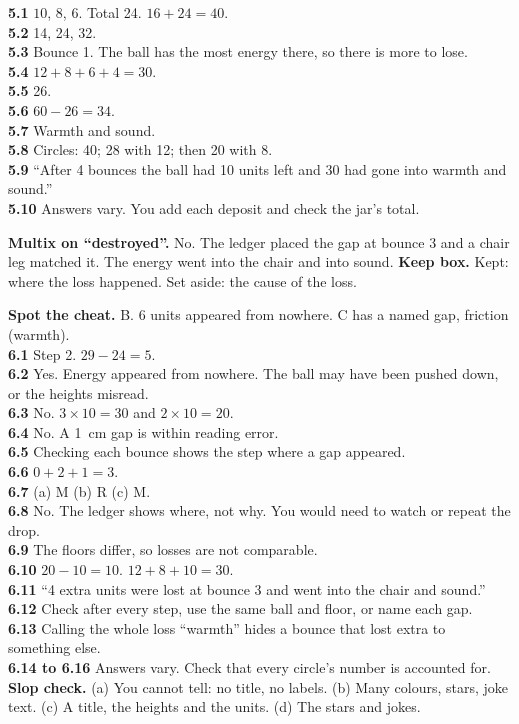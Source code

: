 \textbf{5.1} $10$, $8$, $6$. Total 24. $16+24=40$.\\
\textbf{5.2} 14, 24, 32.\\
\textbf{5.3} Bounce 1. The ball has the most energy there, so there is more to lose.\\
\textbf{5.4} $12+8+6+4=30$.\\
\textbf{5.5} 26.\\
\textbf{5.6} $60-26=34$.\\
\textbf{5.7} Warmth and sound.\\
\textbf{5.8} Circles: 40; 28 with 12; then 20 with 8.\\
\textbf{5.9} ``After 4 bounces the ball had 10 units left and 30 had gone into warmth and sound.''\\
\textbf{5.10} Answers vary. You add each deposit and check the jar's total.

\textbf{Multix on ``destroyed''.} No. The ledger placed the gap at bounce 3 and a chair leg matched it. The energy went into the chair and into sound. \textbf{Keep box.} Kept: where the loss happened. Set aside: the cause of the loss.

\textbf{Spot the cheat.} B. 6 units appeared from nowhere. C has a named gap, friction (warmth).\\
\textbf{6.1} Step 2. $29-24=5$.\\
\textbf{6.2} Yes. Energy appeared from nowhere. The ball may have been pushed down, or the heights misread.\\
\textbf{6.3} No. $3\times10=30$ and $2\times10=20$.\\
\textbf{6.4} No. A 1~cm gap is within reading error.\\
\textbf{6.5} Checking each bounce shows the step where a gap appeared.\\
\textbf{6.6} $0+2+1=3$.\\
\textbf{6.7} (a) M (b) R (c) M.\\
\textbf{6.8} No. The ledger shows where, not why. You would need to watch or repeat the drop.\\
\textbf{6.9} The floors differ, so losses are not comparable.\\
\textbf{6.10} $20-10=10$. $12+8+10=30$.\\
\textbf{6.11} ``4 extra units were lost at bounce 3 and went into the chair and sound.''\\
\textbf{6.12} Check after every step, use the same ball and floor, or name each gap.\\
\textbf{6.13} Calling the whole loss ``warmth'' hides a bounce that lost extra to something else.\\
\textbf{6.14 to 6.16} Answers vary. Check that every circle's number is accounted for.\\
\textbf{Slop check.} (a) You cannot tell: no title, no labels. (b) Many colours, stars, joke text. (c) A title, the heights and the units. (d) The stars and jokes.

